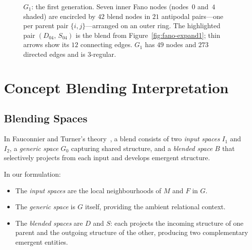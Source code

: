 \documentclass[11pt, a4paper]{article}
\theoremstyle{definition}
\theoremstyle{plain}
\theoremstyle{remark}
\begin{document}
\begin{figure}[ht]
\caption{$G_1$: the first generation.  Seven inner Fano nodes
(nodes~$0$ and~$4$ shaded) are encircled by $42$ blend nodes in $21$
antipodal pairs---one per parent pair $\{i,j\}$---arranged on an outer ring.
The highlighted pair $(D_{04},\,S_{04})$ is the blend from
Figure~\ref{fig:fano-expand1}; thin arrows show its $12$ connecting edges.
$G_1$ has $49$ nodes and $273$ directed edges and is $3$-regular.}
\label{fig:fano-g1}
\end{figure}

\section{Concept Blending Interpretation}
\label{sec:blending}

\subsection{Blending Spaces}

In Fauconnier and Turner's theory~\cite{fauconnier1998}, a blend consists of
two \emph{input spaces} $I_1$ and $I_2$, a \emph{generic space} $G_0$
capturing shared structure, and a \emph{blended space} $B$ that selectively
projects from each input and develops emergent structure.

In our formulation:
\begin{itemize}[leftmargin=2em]
  \item The \emph{input spaces} are the local neighbourhoods of $M$ and $F$
    in $G$.
  \item The \emph{generic space} is $G$ itself, providing the ambient
    relational context.
  \item The \emph{blended spaces} are $D$ and $S$: each projects the incoming
    structure of one parent and the outgoing structure of the other, producing
    two complementary emergent entities.
\end{itemize}
\end{document}
